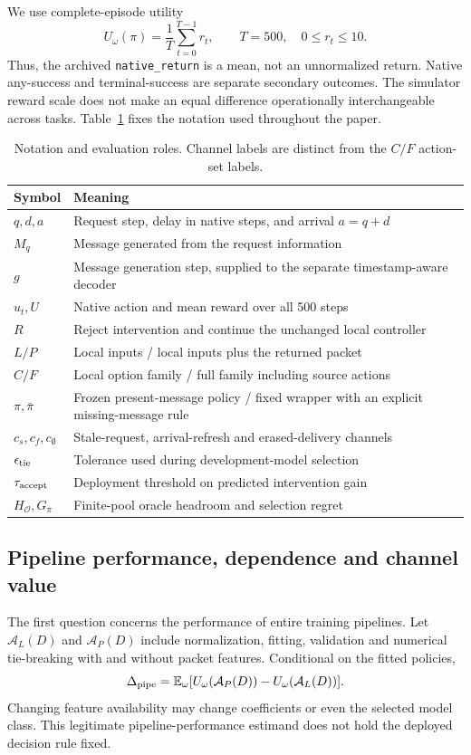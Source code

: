 We use complete-episode utility
\begin{equation}
 U_\omega(\pi)=\frac{1}{T}\sum_{t=0}^{T-1}r_t,\qquad T=500,\quad 0\leq r_t\leq10.
\end{equation}
Thus, the archived \texttt{native\_return} is a mean, not an unnormalized return. Native any-success and terminal-success are separate secondary outcomes. The simulator reward scale does not make an equal difference operationally interchangeable across tasks. Table~\ref{tab:notation} fixes the notation used throughout the paper.
\begin{table}[tb]\centering\small
\caption{Notation and evaluation roles. Channel labels are distinct from the $C/F$ action-set labels.}\label{tab:notation}
\begin{tabular}{lp{}}\toprule
Symbol & Meaning\\\midrule
$q,d,a$ & Request step, delay in native steps, and arrival $a=q+d$\\
$M_q$ & Message generated from the request information\\
$g$ & Message generation step, supplied to the separate timestamp-aware decoder\\
$u_t,U$ & Native action and mean reward over all 500 steps\\
$R$ & Reject intervention and continue the unchanged local controller\\
$L/P$ & Local inputs / local inputs plus the returned packet\\
$C/F$ & Local option family / full family including source actions\\
$\pi,\bar\pi$ & Frozen present-message policy / fixed wrapper with an explicit missing-message rule\\
$c_s,c_f,c_\emptyset$ & Stale-request, arrival-refresh and erased-delivery channels\\
$\epsilon_{\rm tie}$ & Tolerance used during development-model selection\\
$\tau_{\rm accept}$ & Deployment threshold on predicted intervention gain\\
$H_{\mathcal O},G_\pi$ & Finite-pool oracle headroom and selection regret\\\bottomrule
\end{tabular}\end{table}

\subsection{Pipeline performance, dependence and channel value}
The first question concerns the performance of entire training pipelines. Let $\mathcal A_L(D)$ and $\mathcal A_P(D)$ include normalization, fitting, validation and numerical tie-breaking with and without packet features. Conditional on the fitted policies,
\begin{equation}\label{eq:pipeline}
 \Delta_{\rm pipe}=\mathbb{E}_\omega[U_\omega(\mathcal A_P(D))-U_\omega(\mathcal A_L(D))].
\end{equation}
Changing feature availability may change coefficients or even the selected model class. This legitimate pipeline-performance estimand does not hold the deployed decision rule fixed.

